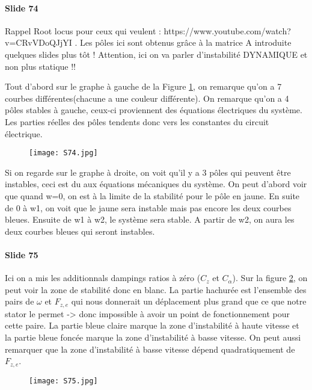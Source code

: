 \paragraph{Slide 74} Rappel Root locus pour ceux qui veulent : https://www.youtube.com/watch?v=CRvVDoQJjYI . Les pôles ici sont obtenus grâce à la matrice A introduite quelques slides plus tôt ! Attention, ici on va parler d'instabilité DYNAMIQUE et non plus statique !! 

Tout d'abord sur le graphe à gauche de la Figure \ref{fig:S74}, on remarque qu'on a 7 courbes différentes(chacune a une couleur différente). On remarque qu'on a 4 pôles stables à gauche, ceux-ci proviennent des équations électriques du système. Les parties réelles des pôles tendents donc vers les constantes du circuit électrique.

\begin{figure}[H]
    \centering
    \texttt{[image: S74.jpg]}
    \caption{}
    \label{fig:S74}
\end{figure}

Si on regarde sur le graphe à droite, on voit qu'il y a 3 pôles qui peuvent être instables, ceci est du aux équations mécaniques du système. On peut d'abord voir que quand w=0, on est à la limite de la stabilité pour le pôle en jaune. En suite de 0 à w1, on voit que le jaune sera instable mais pas encore les deux courbes bleues. Ensuite de w1 à w2, le système sera stable. A partir de w2, on aura les deux courbes bleues qui seront instables. 

\paragraph{Slide 75} Ici on a mis les additionnals dampings ratios à zéro ($C_z$ et $C_\alpha$). Sur la figure \ref{fig:S75}, on peut voir la zone de stabilité donc en blanc. La partie hachurée est l'ensemble des pairs de $\omega$ et $F_{z,e}$ qui nous donnerait un déplacement plus grand que ce que notre stator le permet -> donc impossible à avoir un point de fonctionnement pour cette paire. La partie bleue claire marque la zone d'instabilité à haute vitesse et la partie bleue foncée marque la zone d'instabilité à basse vitesse.
On peut aussi remarquer que la zone d'instabilité à basse vitesse dépend quadratiquement de $F_{z,e}$.
\begin{figure}[H]
    \centering
    \texttt{[image: S75.jpg]}
    \caption{}
    \label{fig:S75}
\end{figure}

